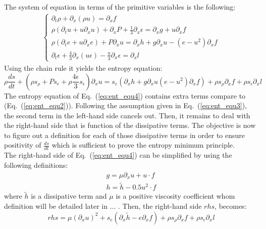 \documentclass{article}
\newcommand{\eqt}[1]{Eq.~(\ref{#1})}                     %
\begin{document}
The system of equation in terms of the primitive variables is the following:
\begin{eqnarray}
\label{eq:radhydro5}
\left\{
\begin{array}{llll}
\partial_t \rho + \partial_x \left( \rho u \right) = \partial_x f \\
\rho \left( \partial_t u + u \partial_x u \right) + \partial_x P +\frac{1}{3} \partial_x \epsilon = \partial_x g + u \partial_x f \\
\rho \left( \partial_t e + u \partial_x e \right) + P \partial_x u =  \partial_x h + g \partial_x u - \left( e - u^2 \right) \partial_x f\\
\partial_t \epsilon + \frac{4}{3} \partial_x \left( u \epsilon \right) - \frac{u}{3} \partial_x \epsilon = \partial_x l
\end{array}
\right.
\end{eqnarray}
Using the chain rule it yields the entropy equation:
\begin{equation}
\label{eq:ent_equ4}
\rho \frac{ds}{dt} + \left( \rho s_{\rho} + P s_e +\rho  \frac{4\epsilon}{3} s_{\epsilon} \right) \partial_x u= s_e \left( \partial_x h + g \partial_x u \left(e- u^2\right) \partial_x f \right) + \rho s_{\rho} \partial_x f + \rho s_{\epsilon}  \partial_x l 
\end{equation}
The entropy equation of \eqt{eq:ent_equ4} contains extra terms compare to (\eqt{eq:ent_equ2}). Following the assumption given in \eqt{eq:ent_equ3}, the second term in the left-hand side cancels out. Then, it remains to deal with the right-hand side that is function of the dissipative terms. The objective is now to figure out a definition for each of those dissipative terms in order to ensure positivity of $\frac{ds}{dt}$ which is sufficient to prove the entropy minimum principle. \\
The right-hand side of \eqt{eq:ent_equ4} can be simplified by using the following definitions:
\begin{eqnarray}
\label{eq:def1}
g = \mu \partial_x u + u \cdot f \nonumber \\
h = \tilde{h} - 0.5 u^2 \cdot f 
\end{eqnarray}
where $\tilde{h}$ is a dissipative term and $\mu$ is a positive viscosity coefficient whom definition will be detailed later in ... .
Then, the right-hand side $rhs$, becomes:
\begin{equation}
rhs = \mu \left( \partial_x u \right)^2  +  s_e \left( \partial_x \tilde{h}-e \partial_x f \right) + \rho s_{\rho} \partial_x f + \rho s_{\epsilon} \partial_x l
\end{equation}
\end{document}
